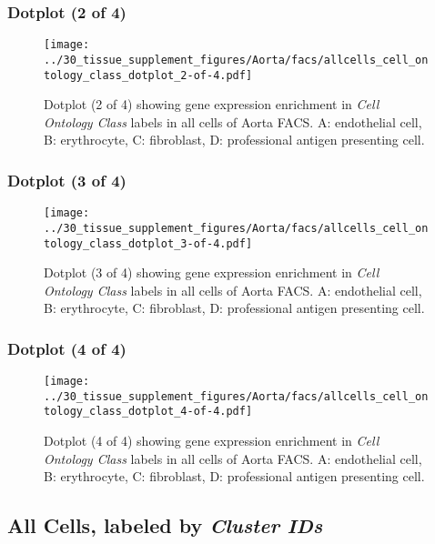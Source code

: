 \clearpage

\subsubsection{Dotplot (2 of 4)}
\begin{figure}[h]
\centering
\texttt{[image: ../30\_tissue\_supplement\_figures/Aorta/facs/allcells\_cell\_ontology\_class\_dotplot\_2-of-4.pdf]}

\caption{ Dotplot (2 of 4)  showing gene expression enrichment in \emph{Cell Ontology Class} labels in all cells of Aorta FACS. A: endothelial cell, B: erythrocyte, C: fibroblast, D: professional antigen presenting cell.}
\end{figure}


\clearpage

\subsubsection{Dotplot (3 of 4)}
\begin{figure}[h]
\centering
\texttt{[image: ../30\_tissue\_supplement\_figures/Aorta/facs/allcells\_cell\_ontology\_class\_dotplot\_3-of-4.pdf]}

\caption{ Dotplot (3 of 4)  showing gene expression enrichment in \emph{Cell Ontology Class} labels in all cells of Aorta FACS. A: endothelial cell, B: erythrocyte, C: fibroblast, D: professional antigen presenting cell.}
\end{figure}


\clearpage

\subsubsection{Dotplot (4 of 4)}
\begin{figure}[h]
\centering
\texttt{[image: ../30\_tissue\_supplement\_figures/Aorta/facs/allcells\_cell\_ontology\_class\_dotplot\_4-of-4.pdf]}

\caption{ Dotplot (4 of 4)  showing gene expression enrichment in \emph{Cell Ontology Class} labels in all cells of Aorta FACS. A: endothelial cell, B: erythrocyte, C: fibroblast, D: professional antigen presenting cell.}
\end{figure}


\clearpage

\subsection{All Cells, labeled by \emph{Cluster IDs}}
